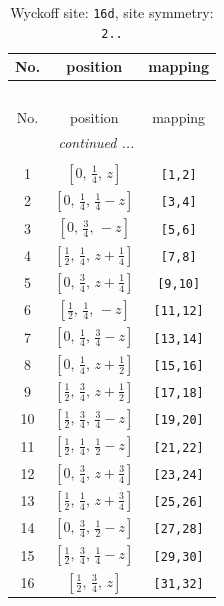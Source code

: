 \documentclass[fleqn,8pt]{jsarticle}
\begin{document}
\renewcommand{\arraystretch}{1.2}
\begin{longtable}{ccc}
\caption{Wyckoff site: {\tt 16d}, site symmetry: {\tt 2..}}
 \\
 \hline \hline
No. & position & mapping \\ \hline \endfirsthead

\multicolumn{2}{l}{\tablename\ \thetable{}} \\
 \hline \hline
No. & position & mapping \\ \hline \endhead

 \hline \hline
\multicolumn{2}{r}{\footnotesize\it continued ...} \\ \endfoot

 \hline \hline
\multicolumn{2}{r}{} \\ \endlastfoot

1 & $\left[ 0,\, \frac{1}{4},\, z \right]$ & {\tt [1,2]} \\ \hline
2 & $\left[ 0,\, \frac{1}{4},\, \frac{1}{4} - z \right]$ & {\tt [3,4]} \\ \hline
3 & $\left[ 0,\, \frac{3}{4},\, - z \right]$ & {\tt [5,6]} \\ \hline
4 & $\left[ \frac{1}{2},\, \frac{1}{4},\, z + \frac{1}{4} \right]$ & {\tt [7,8]} \\ \hline
5 & $\left[ 0,\, \frac{3}{4},\, z + \frac{1}{4} \right]$ & {\tt [9,10]} \\ \hline
6 & $\left[ \frac{1}{2},\, \frac{1}{4},\, - z \right]$ & {\tt [11,12]} \\ \hline
7 & $\left[ 0,\, \frac{1}{4},\, \frac{3}{4} - z \right]$ & {\tt [13,14]} \\ \hline
8 & $\left[ 0,\, \frac{1}{4},\, z + \frac{1}{2} \right]$ & {\tt [15,16]} \\ \hline
9 & $\left[ \frac{1}{2},\, \frac{3}{4},\, z + \frac{1}{2} \right]$ & {\tt [17,18]} \\ \hline
10 & $\left[ \frac{1}{2},\, \frac{3}{4},\, \frac{3}{4} - z \right]$ & {\tt [19,20]} \\ \hline
11 & $\left[ \frac{1}{2},\, \frac{1}{4},\, \frac{1}{2} - z \right]$ & {\tt [21,22]} \\ \hline
12 & $\left[ 0,\, \frac{3}{4},\, z + \frac{3}{4} \right]$ & {\tt [23,24]} \\ \hline
13 & $\left[ \frac{1}{2},\, \frac{1}{4},\, z + \frac{3}{4} \right]$ & {\tt [25,26]} \\ \hline
14 & $\left[ 0,\, \frac{3}{4},\, \frac{1}{2} - z \right]$ & {\tt [27,28]} \\ \hline
15 & $\left[ \frac{1}{2},\, \frac{3}{4},\, \frac{1}{4} - z \right]$ & {\tt [29,30]} \\ \hline
16 & $\left[ \frac{1}{2},\, \frac{3}{4},\, z \right]$ & {\tt [31,32]} \\
\end{longtable}
\end{document}
